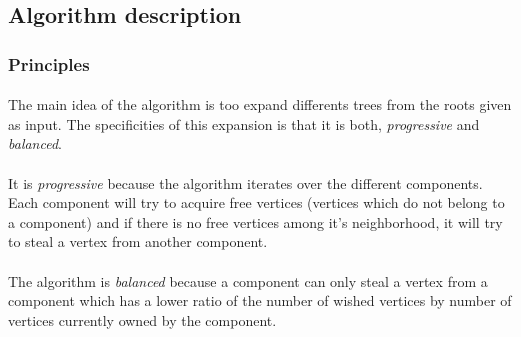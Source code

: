 
\subsection{Algorithm description}
\subsubsection{Principles}
\paragraph{}
The main idea of the algorithm is too expand differents trees from the roots
given as input. The specificities of this expansion is that it is both,
{\em progressive} and {\em balanced}.
\paragraph{}
It is {\em progressive} because the algorithm iterates over the different
components. Each component will try to acquire free vertices (vertices which
do not belong to a component) and if there is no free vertices among it's
neighborhood, it will try to steal a vertex from another component.
\paragraph{}
The algorithm is {\em balanced} because a component can only steal a vertex
from a component which has a lower ratio of the number of wished vertices by
number of vertices currently owned by the component.
